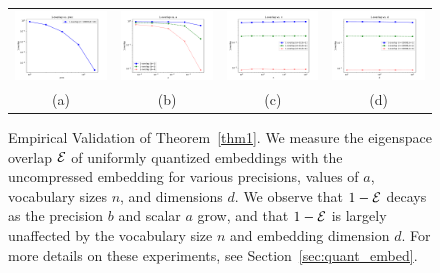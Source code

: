 \begin{figure}
	\begin{tabular}{c c c c}
		\includegraphics[width=0.23\linewidth]{figures/micro_eig_overlap_vs_prec.pdf} &
		\includegraphics[width=0.23\linewidth]{figures/micro_eig_overlap_vs_a_multiple_prec_decay.pdf} &
		\includegraphics[width=0.23\linewidth]{figures/micro_eig_overlap_vs_n_vary_n.pdf} &
		\includegraphics[width=0.23\linewidth]{figures/micro_eig_overlap_vs_d_vary_d.pdf} \\
		(a) & (b) & (c) & (d)
	\end{tabular}
	\caption{Empirical Validation of Theorem~\ref{thm1}. We measure the eigenspace overlap $\eigover$ of uniformly quantized embeddings with the uncompressed embedding for various precisions, values of $a$, vocabulary sizes $n$, and dimensions $d$.  We observe that $1-\eigover$ decays as the precision $b$ and scalar $a$ grow, and that $1-\eigover$ is largely unaffected by the vocabulary size $n$ and embedding dimension $d$.
	For more details on these experiments, see Section~\ref{sec:quant_embed}.}
	\label{fig:micro_eigoverlap}
\end{figure}

